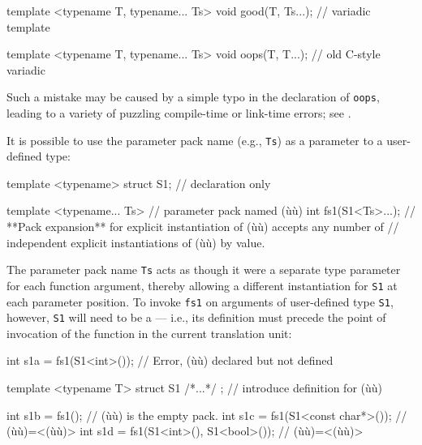 \begin{emcppslisting}
template <typename T, typename... Ts>
void good(T, Ts...);                   // variadic template

template <typename T, typename... Ts>
void oops(T, T...);                    // old C-style variadic
\end{emcppslisting}
    

\noindent Such a mistake may be caused by a simple typo in the declaration of
\lstinline!oops!, leading to a variety of puzzling compile-time or
link-time errors; see .

It is possible to use the parameter pack name (e.g., \lstinline!Ts!) as a
parameter to a user-defined type:

\begin{emcppslisting}[emcppsbatch=e14]
template <typename> struct S1;  // declaration only

template <typename... Ts>       // parameter pack named (ù{}ù)
int fs1(S1<Ts>...);
    // **Pack expansion** for explicit instantiation of (ù{}ù) accepts any number of
    // independent explicit instantiations of (ù{}ù) by value.
\end{emcppslisting}
    

\noindent The parameter pack name \lstinline!Ts! acts as though it were a separate
type parameter for each function argument, thereby allowing a different
instantiation for \lstinline!S1! at each parameter position. To invoke
\lstinline!fs1! on arguments of user-defined type \lstinline!S1!, however,
\lstinline!S1! will need to be a  --- i.e., its
definition must precede the point of invocation of the function in the
current translation unit:

\begin{emcppslisting}[emcppsbatch=e14]
int s1a = fs1(S1<int>());             // Error, (ù{}ù) declared but not defined

template <typename T>
struct S1 { /*...*/ };                // introduce definition for (ù{}ù)

int s1b = fs1();                       // (ù{}ù) is the empty pack.
int s1c = fs1(S1<const char*>());      // (ù{}ù)=<(ù{}ù)>
int s1d = fs1(S1<int>(), S1<bool>());  // (ù{}ù)=<(ù{}ù)>
\end{emcppslisting}
    

